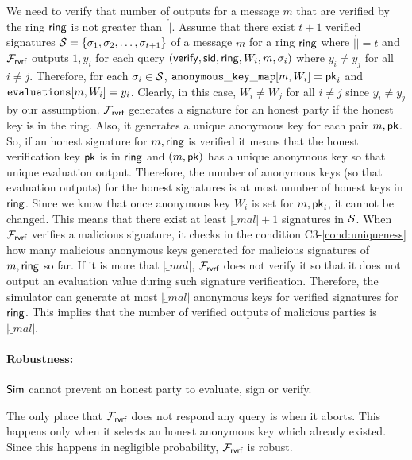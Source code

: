 We need to verify that number of outputs for a message $ m $ that are verified by the ring $ \mathsf{ring} $ is not greater than $ |\ring| $.
Assume that there exist $ t + 1 $ verified signatures $ {\mathcal{S}} = \{\sigma_1, \sigma_2, \ldots, \sigma_{t+1}\} $ of a message $ m $ for a ring $ \mathsf{ring} $ where $ |\ring| = t $ and $ \mathcal{F}_{\textsf{rvrf}} $ outputs $ 1, y_i $ for each query $ (\mathsf{verify}, \textsf{sid}, \mathsf{ring}, W_i, m, \sigma_i) $ where $ y_i \neq y_j $ for all $ i \neq j $. Therefore, for each $ \sigma_i \in {\ensuremath{\mathcal{S}}} $, $ \mathtt{anonymous\_key\_map}[m,W_i] = \mathsf{pk}_i $ and $\texttt{evaluations}[m,W_i] = y_i $. Clearly, in this case, $ W_i \neq W_j $ for all $ i \neq j $ since $ y_i \neq y_j $ by our assumption. $ \mathcal{F}_{\textsf{rvrf}} $ generates a signature for an honest party if the honest key is in the ring. Also, it generates a unique anonymous key for each pair $ m,\mathsf{pk} $. So, if an honest signature for $ m,\mathsf{ring} $ is verified it means that the honest verification key $ \mathsf{pk} $ is in $ \mathsf{ring} $ and $ (m,\mathsf{pk}) $ has a unique anonymous key so that unique evaluation output. Therefore, the number of anonymous keys (so that evaluation outputs) for the honest signatures is at most number of honest keys in $ \mathsf{ring} $. Since we know that once anonymous key $ W_i $ is set for $ m, \mathsf{pk}_i $, it cannot be changed. This means that there exist at least $ |\ring_{mal}| + 1 $ signatures in $ {\mathcal{S}} $. When $ \mathcal{F}_{\textsf{rvrf}} $ verifies a malicious signature, it checks in the condition C3-\ref{cond:uniqueness} how many malicious anonymous keys generated for malicious signatures of $ m, \mathsf{ring} $ so far. If it is more that $ |\ring_{mal}| $, $ \mathcal{F}_{\textsf{rvrf}} $ does not verify it so that it does not output an evaluation value during such signature verification. Therefore, the simulator can generate at most $ |\ring_{mal}| $ anonymous keys for verified signatures for $ \mathsf{ring} $. This implies that the number of verified outputs of malicious parties   is $ |\ring_{mal}| $. 

\paragraph{Robustness:} $ \mathsf{Sim} $ cannot prevent an honest party to evaluate, sign or verify.

The only place that $ \mathcal{F}_{\textsf{rvrf}} $ does not respond any query is when it aborts. This happens only when it selects an honest anonymous key which already existed. Since this happens in negligible probability,  $ \mathcal{F}_{\textsf{rvrf}} $ is robust.

